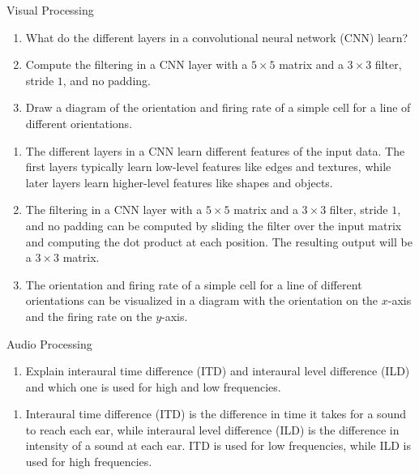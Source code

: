 \documentclass{article}
\begin{document}
\begin{exercise}{Visual Processing}
  \begin{enumerate}
    \item What do the different layers in a convolutional neural network (CNN) learn?
    \item Compute the filtering in a CNN layer with a $5 \times 5$ matrix and a $3 \times 3$ filter, stride $1$, and no padding.
    \item Draw a diagram of the orientation and firing rate of a simple cell for a line of different orientations.
  \end{enumerate}

  \begin{solution}
    \begin{enumerate}
      \item The different layers in a CNN learn different features of the input data. The first layers typically learn low-level features like edges and textures, while later layers learn higher-level features like shapes and objects.
      \item The filtering in a CNN layer with a $5 \times 5$ matrix and a $3 \times 3$ filter, stride $1$, and no padding can be computed by sliding the filter over the input matrix and computing the dot product at each position. The resulting output will be a $3 \times 3$ matrix.
      \item The orientation and firing rate of a simple cell for a line of different orientations can be visualized in a diagram with the orientation on the $x$-axis and the firing rate on the $y$-axis.
    \end{enumerate}
  \end{solution}
\end{exercise}

\begin{exercise}{Audio Processing}
  \begin{enumerate}
    \item Explain interaural time difference (ITD) and interaural level difference (ILD) and which one is used for high and low frequencies.
  \end{enumerate}

  \begin{solution}
    \begin{enumerate}
      \item Interaural time difference (ITD) is the difference in time it takes for a sound to reach each ear, while interaural level difference (ILD) is the difference in intensity of a sound at each ear. ITD is used for low frequencies, while ILD is used for high frequencies.
    \end{enumerate}
  \end{solution}
\end{exercise}
\end{document}

